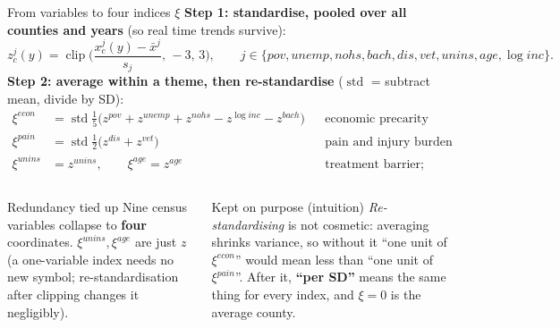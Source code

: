 ﻿\documentclass[9pt,aspectratio=169]{beamer}
\newenvironment{tied}{\begin{alertblock}{Redundancy tied up}\small}{\end{alertblock}}
\newenvironment{kept}{\begin{exampleblock}{Kept on purpose (intuition)}\small}{\end{exampleblock}}
\DeclareMathOperator{\clip}{clip}
\begin{document}
\begin{frame}{From variables to four indices $\xi$}
 \textbf{Step 1: standardise, pooled over all counties and years} (so real time trends survive):
 \[
  z^j_c(y)=\clip\!\Big(\frac{x^j_c(y)-\bar x^j}{s_j},\,-3,\,3\Big),\qquad j\in\{pov,unemp,nohs,bach,dis,vet,unins,age,\log inc\}.
 \]
 \textbf{Step 2: average within a theme, then re-standardise} ($\operatorname{std}$ = subtract mean, divide by SD):
 \begin{align*}
  \xi^{econ}&=\operatorname{std}\tfrac15\big(z^{pov}+z^{unemp}+z^{nohs}-z^{\log inc}-z^{bach}\big) &&\text{economic precarity}\\
  \xi^{pain}&=\operatorname{std}\tfrac12\big(z^{dis}+z^{vet}\big) &&\text{pain and injury burden}\\
  \xi^{unins}&=z^{unins},\qquad \xi^{age}=z^{age} &&\text{treatment barrier; older population}
 \end{align*}
 \begin{columns}[T]
 \begin{tied}
  Nine census variables collapse to \textbf{four} coordinates. $\xi^{unins},\xi^{age}$ are just $z$ (a one-variable index needs no new symbol; re-standardisation after clipping changes it negligibly).
 \end{tied}
 \begin{kept}
  \emph{Re-standardising} is not cosmetic: averaging shrinks variance, so without it ``one unit of $\xi^{econ}$'' would mean less than ``one unit of $\xi^{pain}$''. After it, \textbf{``per SD''} means the same thing for every index, and $\xi=0$ is the average county.
 \end{kept}
 \end{columns}
\end{frame}
\end{document}
